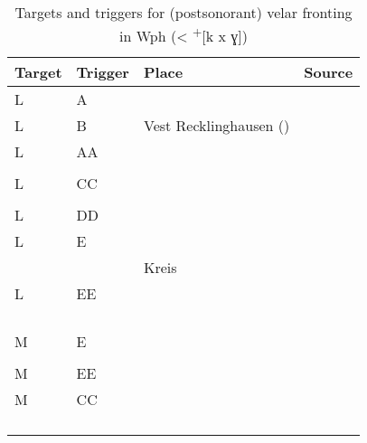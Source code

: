 \begin{table}
\caption{Targets and triggers for (postsonorant) velar fronting in Wph (< \textsuperscript{+}[k x ɣ])\label{tab:12.15}}
\begin{tabularx}{\textwidth}{llQQ}
\lsptoprule
Target  & Trigger & Place & Source\\
\midrule
L & A &   & \citet{Gregory1934}\\
L & B & Vest Recklinghausen () & \citet{Hellberg1936}\\
L & AA &    & \citet{Martin1925}\\
  &    &  & \citet{Martin1942}\\
L & CC &   &\citet{Böger1906}\\
  &    &   &           \citet{Borchert1955}\\
L & DD &   & \citet{Collitz1899}\\
L & E &              &  \citet{Martin1942} \\
  &   &   Kreis  &  \citet{BethgeBonnin1969}\\
L & EE &          & \citet{Holthausen1886} \\
  &     &       &  \citet{Brand1914}     \\
  &     &     &  \citet{Martin1942}    \\
  &     &            &  \citet{Niebaum1974}   \\
  &     &        &  \citet{NiebaumTeepe1976}\\
M & E &     &\citet{Arens1908}\\
  &   &   &  \citet{Herdemann1921}\\
M & EE &   & \citet{Keller1961}\\
M & CC &          & \citet{Hoffmann1887}   \\
  &    &   & \citet{Schwagmeyer1908}\\
  &    &      & \citet{Seymour1970}    \\
  &    &    & \citet{Stellmacher1972}\\
\lspbottomrule
\end{tabularx}
\end{table}

